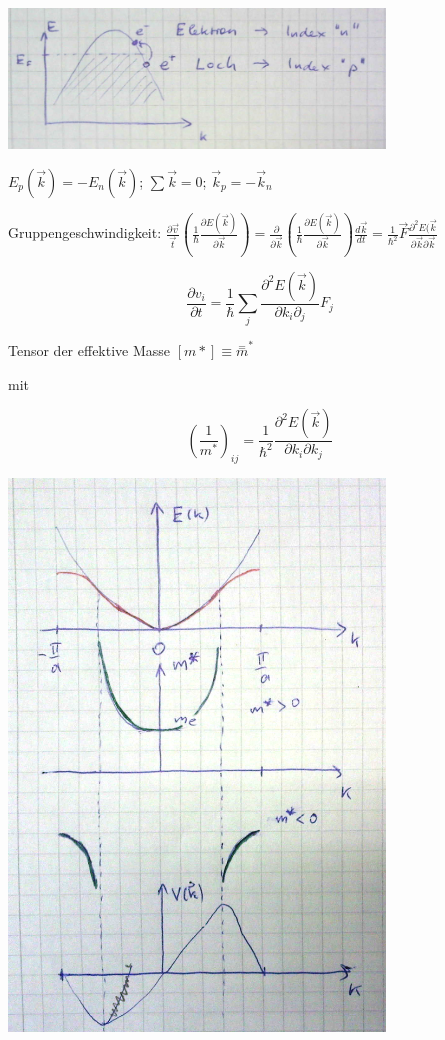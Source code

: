 \includegraphics[width=0.75\textwidth]{kap10_02.png}

\(E_p(\vec k) = -E_n(\vec k)\); \(\sum \vec k = 0\); \(\vec k_p = - \vec k_n \)

Gruppengeschwindigkeit: \(\frac{\partial \vec v}{\vec t}(\frac{1}{\hbar}\frac{\partial E(\vec k)}{\partial \vec k})=\frac{\partial}{\partial \vec k}(\frac{1}{\hbar}\frac{\partial E(\vec k)}{\partial \vec k})\frac{d\vec k}{dt}=\frac{1}{\hbar^2}\vec F\frac{\partial^2 E(\vec k}{\partial \vec k\partial\vec k}\)

\[\frac{\partial v_i}{\partial t} = \frac{1}{\hbar}\sum_j \frac{\partial^2 E(\vec k)}{\partial k_i\partial_j}F_j\]

Tensor der effektive Masse \([m*]\equiv \stackrel{\mathrm{=}}m^* \)

mit 

\[\left(\frac{1}{m^*}\right)_{ij}=\frac{1}{\hbar^2}\frac{\partial^2 E(\vec k)}{\partial k_i\partial k_j}\]


\includegraphics[width=0.75\textwidth]{kap10_03.png}


